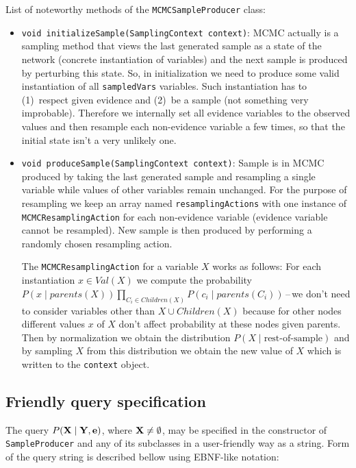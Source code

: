 \documentclass[english,cover]{fitthesis} %
\newcommand{\srccode}[1]{{\tt #1}}         %
\newcommand{\vars}[1]{{\bold{#1}}}         %
\begin{document}
\medskip
List of noteworthy methods of the \srccode{MCMCSampleProducer} class:
\begin{itemize}
	\item \srccode{void initializeSample(SamplingContext context)}: MCMC actually is a sampling method that views the last generated sample as a state of the network (concrete instantiation of variables) and the next sample is produced by perturbing this state. So, in initialization we need to produce some valid instantiation of all \srccode{sampledVars} variables. Such instantiation has to (1)~respect given evidence and (2)~be a  sample (not something very improbable). Therefore we internally set all evidence variables to the observed values and then resample each non-evidence variable a few times, so that the initial state isn't a very unlikely one.
	\item \srccode{void produceSample(SamplingContext context)}: Sample is in MCMC produced by taking the last generated sample and resampling a single variable while values of other variables remain unchanged. For the purpose of resampling we keep an array named \srccode{resamplingActions} with one instance of \srccode{MCMCResamplingAction} for each non-evidence variable (evidence variable cannot be resampled). New sample is then produced by performing a randomly chosen resampling action.
	
	The \srccode{MCMCResamplingAction} for a variable $X$ works as follows: For each instantiation $x \in Val(X)$ we compute the probability $P(x \mid parents(X)) \prod_{C_i \in Children(X)} P(c_i \mid parents(C_i))$\,--\,we don't need to consider variables other than $X \cup Children(X)$ because for other nodes different values $x$ of $X$ don't affect probability at these nodes given parents. Then by normalization we obtain the distribution $P(X \mid \text{rest-of-sample})$ and by sampling $X$ from this distribution we obtain the new value of $X$ which is written to the \srccode{context} object.
\end{itemize}


\subsection{Friendly query specification}
The query $P(\vars{X} \mid \vars{Y}, \vars{e})$, where $\vars{X} \neq \emptyset$, may be specified in the constructor of \srccode{SampleProducer} and any of its subclasses in a user-friendly way as a string. Form of the query string is described bellow using EBNF-like notation:
\end{document}
